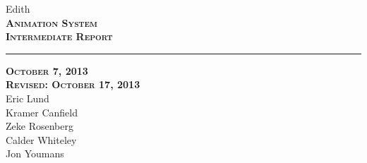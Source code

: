 \documentclass[12pt]{article}
\begin{document}
\begin{titlepage}
	\begin{center}
	\huge  Edith \\
	\vspace*{\fill}%
 	\huge \textsc{\textbf{Animation System \\Intermediate Report} }	
	\bigskip 
	\rule{130mm}{.1pt}
	\textsc{\textbf{October 7, 2013 \\ Revised: October 17, 2013} \\ }	
	\vspace*{\fill}%
	Eric Lund \\
	Kramer Canfield \\ 
	Zeke Rosenberg \\
	Calder Whiteley \\
	Jon Youmans
	\end{center}
\end{titlepage}
\end{document}

